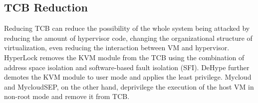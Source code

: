 ﻿\documentclass[conference]{IEEEtran}
\begin{document}

\subsection{TCB Reduction}
Reducing TCB can reduce the possibility of the whole system being attacked by reducing the amount of hypervisor code, changing the organizational structure of virtualization, even reducing the interaction between VM and hypervisor.
HyperLock\cite{hyperlock} removes the KVM module from the TCB using the combination of address space isolation and software-based fault isolation (SFI). DeHype\cite{dehy} further demotes the KVM module to user mode and applies the least privilege. Mycloud\cite{mycloud} and MycloudSEP\cite{Detangling}, on the other hand, deprivilege the execution of the host VM in non-root mode and remove it from TCB.
\end{document}
